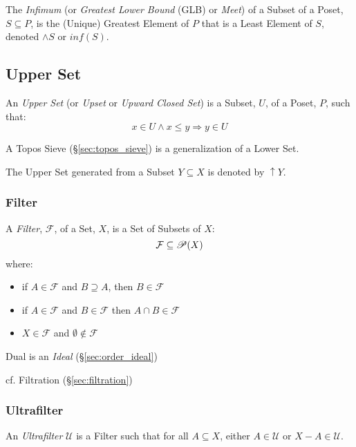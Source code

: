 The \emph{Infimum} (or \emph{Greatest Lower Bound} (GLB) or
\emph{Meet}) of a Subset of a Poset, $S \subseteq P$, is the (Unique)
Greatest Element of $P$ that is a Least Element of $S$, denoted
$\wedge S$ or $inf (S)$.



\subsection{Upper Set}\label{sec:upper_set}

An \emph{Upper Set} (or \emph{Upset} or \emph{Upward Closed Set}) is a
Subset, $U$, of a Poset, $P$, such that:
\[
  x \in U \wedge x \leq y \Rightarrow y \in U
\]

A Topos Sieve (\S\ref{sec:topos_sieve}) is a generalization of a Lower
Set.

The Upper Set generated from a Subset $Y \subseteq X$ is denoted by
$\uparrow Y$.



\subsubsection{Filter}\label{sec:filter}

A \emph{Filter}, $\mathcal{F}$, of a Set, $X$, is a Set of Subsets of
$X$:
\[
  \mathcal{F} \subseteq \mathscr{P}(X)
\]
where:
\begin{itemize}
\item if $A \in \mathcal{F}$ and $B \supseteq A$, then $B \in
  \mathcal{F}$
\item if $A \in \mathcal{F}$ and $B \in \mathcal{F}$ then $A \cap B
  \in \mathcal{F}$
\item $X \in \mathcal{F}$ and $\emptyset \notin \mathcal{F}$
\end{itemize}

Dual is an \emph{Ideal} (\S\ref{sec:order_ideal})

cf. Filtration (\S\ref{sec:filtration})



\subsubsection{Ultrafilter}\label{sec:ultrafilter}

An \emph{Ultrafilter} $\mathcal{U}$ is a Filter such that for all $A
\subseteq X$, either $A \in \mathcal{U}$ or $X - A \in \mathcal{U}$.



